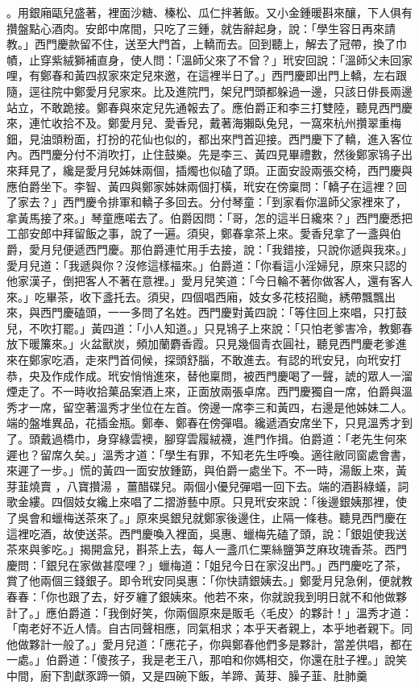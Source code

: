 \begin{showcontents}{}
。用銀廂甌兒盛著，裡面沙糖、榛松、瓜仁拌著飯。又小金鍾暖斟來釀，下人俱有攢盤點心酒肉。安郎中席間，只吃了三鍾，就告辭起身，說：「學生容日再來請教。」西門慶款留不住，送至大門首，上轎而去。回到聽上，解去了冠帶，換了巾幘，止穿紫絨獅補直身，使人問：「溫師父來了不曾？」玳安回說：「溫師父未回家哩，有鄭春和黃四叔家來定兒來邀，在這裡半日了。」西門慶即出門上轎，左右跟隨，逕往院中鄭愛月兒家來。比及進院門，架兒門頭都躲過一邊，只該日俳長兩邊站立，不敢跪接。鄭春與來定兒先通報去了。應伯爵正和李三打雙陸，聽見西門慶來，連忙收拾不及。鄭愛月兒、愛香兒，戴著海獺臥兔兒，一窩來杭州攢翠重梅鈿，見油頭粉面，打扮的花仙也似的，都出來門首迎接。西門慶下了轎，進入客位內。西門慶分付不消吹打，止住鼓樂。先是李三、黃四見畢禮數，然後鄭家鴇子出來拜見了，纔是愛月兒姊妹兩個，插燭也似磕了頭。正面安設兩張交椅，西門慶與應伯爵坐下。李智、黃四與鄭家姊妹兩個打橫，玳安在傍稟問：「轎子在這裡？回了家去？」西門慶令排軍和轎子多回去。分付琴童：「到家看你溫師父家裡來了，拿黃馬接了來。」琴童應喏去了。伯爵因問：「哥，怎的這半日纔來？」西門慶悉把工部安郎中拜留飯之事，說了一遍。須臾，鄭春拿茶上來。愛香兒拿了一盞與伯爵，愛月兒便遞西門慶。那伯爵連忙用手去接，說：「我錯接，只說你遞與我來。」愛月兒道：「我遞與你？沒修這樣福來。」伯爵道：「你看這小淫婦兒，原來只認的他家漢子，倒把客人不著在意裡。」愛月兒笑道：「今日輪不著你做客人，還有客人來。」吃畢茶，收下盞托去。須臾，四個唱西廂，妓女多花枝招颱，綉帶飄飄出來，與西門慶磕頭，一一多問了名姓。西門慶對黃四說：「等住回上來唱，只打鼓兒，不吹打罷。」黃四道：「小人知道。」只見鴇子上來說：「只怕老爹害冷，教鄭春放下暖簾來。」火盆獸炭，頻加蘭麝香霞。只見幾個青衣圓社，聽見西門慶老爹進來在鄭家吃酒，走來門首伺候，探頭舒腦，不敢進去。有認的玳安兒，向玳安打恭，央及作成作成。玳安悄悄進來，替他稟問，被西門慶喝了一聲，諕的眾人一溜煙走了。不一時收拾菓品案酒上來，正面放兩張卓席。西門慶獨自一席，伯爵與溫秀才一席，留空著溫秀才坐位在左首。傍邊一席李三和黃四，右邊是他姊妹二人。端的盤堆異品，花插金瓶。鄭奉、鄭春在傍彈唱。纔遞酒安席坐下，只見溫秀才到了。頭戴過橋巾，身穿綠雲襖，腳穿雲履絨襪，進門作揖。伯爵道：「老先生何來遲也？留席久矣。」溫秀才道：「學生有罪，不知老先生呼喚。適往敝同窗處會書，來遲了一步。」慌的黃四一面安放鍾筯，與伯爵一處坐下。不一時，湯飯上來，黃芽韮燒賣 ，八寶攢湯 ，薑醋碟兒。兩個小優兒彈唱一回下去。端的酒斟綠蟻，詞歌金縷。四個妓女纔上來唱了二摺游藝中原。只見玳安來說：「後邊銀姨那裡，使了吳會和蠟梅送茶來了。」原來吳銀兒就鄭家後邊住，止隔一條巷。聽見西門慶在這裡吃酒，故使送茶。西門慶喚入裡面，吳惠、蠟梅先磕了頭，說：「銀姐使我送茶來與爹吃。」揭開盒兒，斟茶上去，每人一盞爪仁栗絲鹽笋芝麻玫瑰香茶。西門慶問：「銀兒在家做甚麼哩？」蠟梅道：「姐兒今日在家沒出門。」西門慶吃了茶，賞了他兩個三錢銀子。即令玳安同吳惠：「你快請銀姨去。」鄭愛月兒急俐，便就教春春：「你也跟了去，好歹纏了銀姨來。他若不來，你就說我到明日就不和他做夥計了。」應伯爵道：「我倒好笑，你兩個原來是販毛〈毛皮〉的夥計！」溫秀才道：「南老好不近人情。自古同聲相應，同氣相求；本乎天者親上，本乎地者親下。同他做夥計一般了。」愛月兒道：「應花子，你與鄭春他們多是夥計，當差供唱，都在一處。」伯爵道：「傻孩子，我是老王八，那咱和你媽相交，你還在肚子裡。」說笑中間，廚下割獻豕蹄一領，又是四碗下飯，羊蹄、黃芽、臊子韮、肚肺羹 
\end{showcontents}
